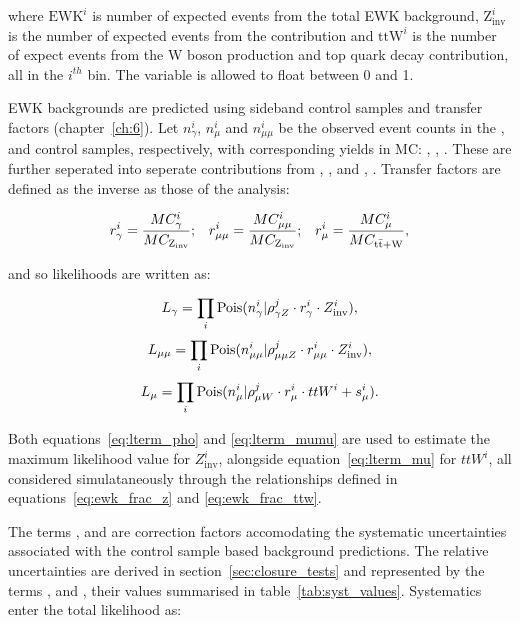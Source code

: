 where $\text{EWK}^i$ is number of expected events from the total EWK background,
$\text{Z}_{\text{inv}}^i$ is the number of expected events from the \zinv 
contribution and $\text{ttW}^i$ is the number of expect events from the W boson 
production and top quark decay contribution, all in the $i^{th}$ bin. The variable 
\fzinv is allowed to float between 0 and 1.

EWK backgrounds are predicted using sideband control samples and transfer 
factors (chapter~\ref{ch:6}). Let $n_{\gamma}^i$, $n_{\mu}^i$ and $n_{\mu\mu}^i$ be 
the observed event counts in the \gj, \mj and \mmj control samples, 
respectively, with corresponding yields in MC: \mcp, \mcm, \mcmm. These are
further seperated into seperate contributions from \zinv,
\mczinv, and , \mcttw. Transfer
factors are defined as the inverse as those of the analysis:

\begin{equation}
r_{\gamma}^i = \frac{MC_{\gamma}^i}{MC_{\text{Z}_{\text{inv}}}};\;\;\;
r_{\mu\mu}^i = \frac{MC_{\mu\mu}^i}{MC_{\text{Z}_{\text{inv}}}};\;\;\;
r_{\mu}^i = \frac{MC_{\mu}^i}{MC_{\rm{t}\bar{\rm{t}}+\text{W}}},
\end{equation}

and so likelihoods are written as:

\begin{equation}
L_{\gamma} = \prod_i \text{Pois}(n_{\gamma}^i | \rho^j_{\gamma Z} \cdot r^i_{\gamma} \cdot Z^i_{\text{inv}}),
\label{eq:lterm_pho}
\end{equation}
\begin{equation}
L_{\mu\mu} = \prod_i \text{Pois}(n_{\mu\mu}^i | \rho^j_{\mu\mu Z} \cdot r^i_{\mu\mu} \cdot Z^i_{\text{inv}}),
\label{eq:lterm_mumu}
\end{equation}
\begin{equation}
L_{\mu} = \prod_i \text{Pois}(n_{\mu}^i | \rho^j_{\mu W} \cdot r^i_{\mu} \cdot ttW^i + s_{\mu}^i).
\label{eq:lterm_mu}
\end{equation}

Both equations~\ref{eq:lterm_pho} and \ref{eq:lterm_mumu} are used to estimate the 
maximum likelihood value for $Z^i_{\text{inv}}$, alongside equation~\ref{eq:lterm_mu} 
for $ttW^i$, all considered simulataneously through the relationships defined in
equations~\ref{eq:ewk_frac_z} and \ref{eq:ewk_frac_ttw}.

The terms \rhopz, \rhommz and \rhomw are correction factors accomodating the
systematic uncertainties associated with the control sample based background 
predictions. The relative uncertainties are derived in
section~\ref{sec:closure_tests} and represented by the terms \sigmapz, \sigmammz
and \sigmamw, their 
values summarised in table~\ref{tab:syst_values}. Systematics enter the total
likelihood as:


